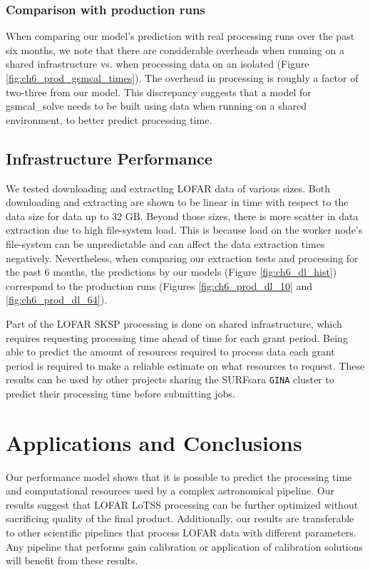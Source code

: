 \subsubsection{Comparison with production runs}

When comparing our model's prediction with real processing runs over the past six months, we note that there are considerable overheads when running on a shared infrastructure vs. when processing data on an isolated (Figure \ref{fig:ch6_prod_gsmcal_times}). The overhead in processing is roughly a factor of two-three from our model. This discrepancy suggests that a model for {\selectfont gsmcal\_solve} needs to be built using data when running on a shared environment, to better predict processing time. 

\subsection{Infrastructure Performance}
We tested downloading and extracting LOFAR data of various sizes. Both downloading and extracting are shown to be linear in time with respect to the data size for data up to 32 GB. Beyond those sizes, there is more scatter in data extraction due to high file-system load. This is because load on the worker node's file-system can be unpredictable and can affect the data extraction times negatively. Nevertheless, when comparing our extraction tests and processing for the past 6 months, the predictions by our models (Figure \ref{fig:ch6_dl_hist}) correspond to the production runs (Figures \ref{fig:ch6_prod_dl_10} and \ref{fig:ch6_prod_dl_64}).  


Part of the LOFAR SKSP processing is done on shared infrastructure, which requires requesting processing time ahead of time for each grant period. Being able to predict the amount of resources required to process data each grant period is required to make a reliable estimate on what resources to request. These results can be used by other projects sharing the SURFsara \texttt{GINA} cluster to predict their processing time before submitting jobs. 

\section{Applications and Conclusions}

Our performance model shows that it is possible to predict the processing time and computational resources used by a complex astronomical pipeline. Our results suggest that LOFAR LoTSS processing can be further optimized without sacrificing quality of the final product. Additionally, our results are transferable to other scientific pipelines that process LOFAR data with different parameters.  Any pipeline that performs gain calibration or application of calibration solutions will benefit from these results. 

